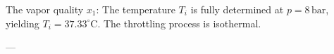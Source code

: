 The vapor quality \( x_1 \):  
The temperature \( T_i \) is fully determined at \( p = 8 \, \text{bar} \), yielding \( T_i = 37.33^\circ\text{C} \).  
The throttling process is isothermal.

---